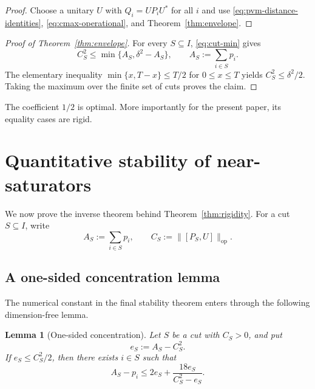 \documentclass[11pt]{article}
\newtheorem{lemma}[theorem]{Lemma}
\newcommand{\op}{\mathrm{op}}
\newcommand{\dd}{\delta}
\begin{document}
\begin{proof}
Choose a unitary $U$ with $Q_i=UP_iU^*$ for all $i$ and use
\eqref{eq:pvm-distance-identities}, \eqref{eq:cmax-operational}, and
Theorem~\ref{thm:envelope}.
\end{proof}

\begin{proof}[Proof of Theorem~\ref{thm:envelope}]
For every $S\subseteq I$, \eqref{eq:cut-min} gives
\[
  C_S^2
  \le
  \min\{A_S,\dd^2-A_S\},
  \qquad
  A_S:=\sum_{i\in S}p_i.
\]
The elementary inequality
$\min\{x,T-x\}\le T/2$ for $0\le x\le T$ yields
$C_S^2\le\dd^2/2$.  Taking the maximum over the finite set of cuts proves the
claim.
\end{proof}

The coefficient $1/2$ is optimal.  More importantly for the present paper,
its equality cases are rigid.

\section{Quantitative stability of near-saturators}

We now prove the inverse theorem behind Theorem~\ref{thm:rigidity}.  For a
cut $S\subseteq I$, write
\[
  A_S:=\sum_{i\in S}p_i,
  \qquad
  C_S:=\|[P_S,U]\|_{\op}.
\]

\subsection{A one-sided concentration lemma}

The numerical constant in the final stability theorem enters through the
following dimension-free lemma.

\begin{lemma}[One-sided concentration]\label{lem:onesided}
Let $S$ be a cut with $C_S>0$, and put
\[
  e_S:=A_S-C_S^2.
\]
If $e_S\le C_S^2/2$, then there exists $i\in S$ such that
\begin{equation}\label{eq:onesided}
  A_S-p_i
  \le
  2e_S+\frac{18e_S}{C_S^2-e_S}.
\end{equation}
\end{lemma}
\end{document}
